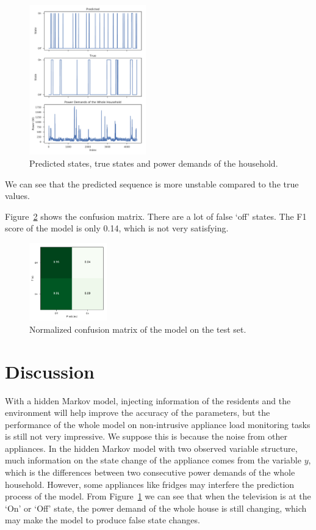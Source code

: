 \documentclass[sigconf]{acmart}
\begin{document}
\begin{figure}[ht]
  \centering
  \includegraphics[width=0.45\textwidth]{figures/hmm-results}
  \caption{\label{fig:hmm-results} Predicted states, true states and
    power demands of the household.}
\end{figure}

We can see that the predicted sequence is more unstable compared to
the true values.

Figure~\ref{fig:cm} shows the confusion matrix. There are a lot of
false `off' states. The F1 score of the model is only 0.14, which is
not very satisfying.

\begin{figure}[ht]
  \centering
  \includegraphics[width=0.3\textwidth]{figures/cm}
  \caption{\label{fig:cm} Normalized confusion matrix of the model on
    the test set.}
\end{figure}

\balance{}

\section{Discussion}

With a hidden Markov model, injecting information of the residents and
the environment will help improve the accuracy of the parameters, but
the performance of the whole model on non-intrusive appliance load
monitoring tasks is still not very impressive. We suppose this is
because the noise from other appliances. In the hidden Markov model
with two observed variable structure, much information on the state
change of the appliance comes from the variable $y$, which is the
differences between two consecutive power demands of the whole
household. However, some appliances like fridges may interfere the
prediction process of the model. From Figure~\ref{fig:hmm-results} we
can see that when the television is at the `On' or `Off' state, the
power demand of the whole house is still changing, which may make the
model to produce false state changes.
\end{document}
